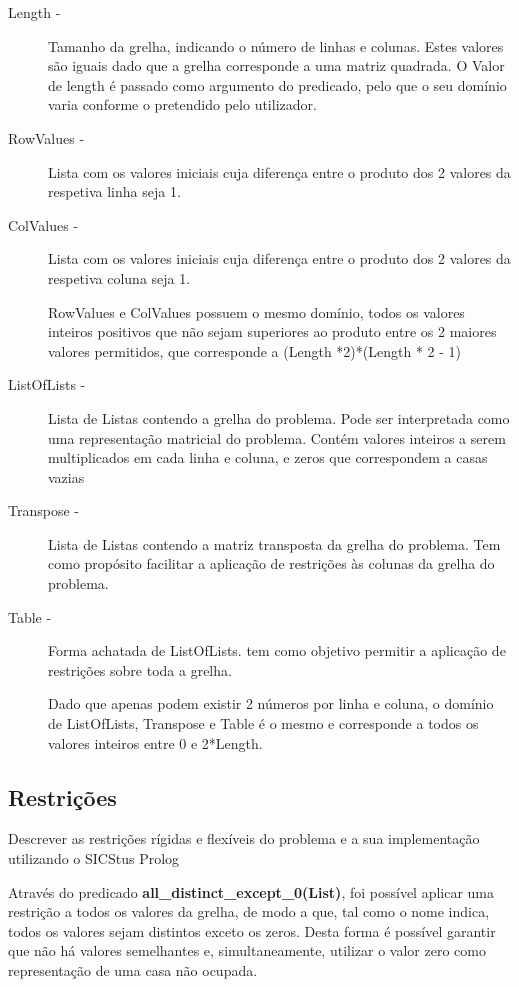 \documentclass[11pt]{article}
\begin{document}
\begin{description}

\item[Length - ] Tamanho da grelha, indicando o número de linhas e colunas. Estes valores são iguais dado que a grelha corresponde a uma matriz quadrada. O Valor de length é passado como argumento do predicado, pelo que o seu domínio varia conforme o pretendido pelo utilizador.

\item[RowValues - ] Lista com os valores iniciais cuja diferença entre o produto dos 2 valores da respetiva linha seja 1.

\item[ColValues - ] Lista com os valores iniciais cuja diferença entre o produto dos 2 valores da respetiva coluna seja 1.

RowValues e ColValues possuem o mesmo domínio, todos os valores inteiros positivos que não sejam superiores ao produto entre os 2 maiores valores permitidos, que corresponde a (Length *2)*(Length * 2 - 1)

\item[ListOfLists - ] Lista de Listas contendo a grelha do problema. Pode ser interpretada como uma representação matricial do problema. Contém valores inteiros a serem multiplicados em cada linha e coluna, e zeros que correspondem a casas vazias

\item[Transpose - ] Lista de Listas contendo a matriz transposta da grelha do problema. Tem como propósito facilitar a aplicação de restrições às colunas da grelha do problema.

\item[Table - ] Forma achatada de ListOfLists. tem como objetivo permitir a aplicação de restrições sobre toda a grelha. 

Dado que apenas podem existir 2 números por linha e coluna, o domínio de ListOfLists, Transpose e Table é o mesmo e corresponde a todos os valores inteiros entre 0 e 2*Length.



\end{description}

\subsection{Restrições} Descrever as restrições rígidas e flexíveis do problema e a
sua implementação utilizando o SICStus Prolog

Através do predicado\textbf{ all\_distinct\_except\_0(List)}, foi possível aplicar uma restrição a todos os valores da grelha, de modo a que, tal como o nome indica, todos os valores sejam distintos exceto os zeros. Desta forma é possível garantir que não há valores semelhantes e, simultaneamente, utilizar o valor zero como representação de uma casa não ocupada.
\end{document}
